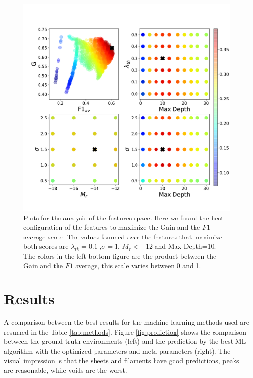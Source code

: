 \documentclass[usenatbib]{mnras}
\begin{document}
\begin{figure}
\centering
    \includegraphics[scale=0.5]{Figs/p_FS_Tree.pdf}
    \caption{Plots for the analysis of the features space. Here we found the best configuration of the features to maximize the Gain and the $F1$ average score. The values founded over the features that maximize both scores are $\lambda_{th}=0.1$ ,$\sigma=1$, $M_{r}<-12$ and Max Depth=10. The colors in the left bottom figure are the product between the Gain and the $F1$ average, this scale varies between 0 and 1.}
    \label{fig:features_space}
\end{figure}


\section{Results}\label{sec:results}

A comparison between the best results for the machine learning methods used are resumed in the Table \ref{tab:methods}. Figure \ref{fig:prediction} shows the comparison between the ground truth environments (left) and the prediction by the best ML algorithm with the optimized parameters and meta-parameters (right). 
The visual impression is that the sheets and filaments have good predictions, 
peaks are reasonable, while voids are the worst.
\end{document}
